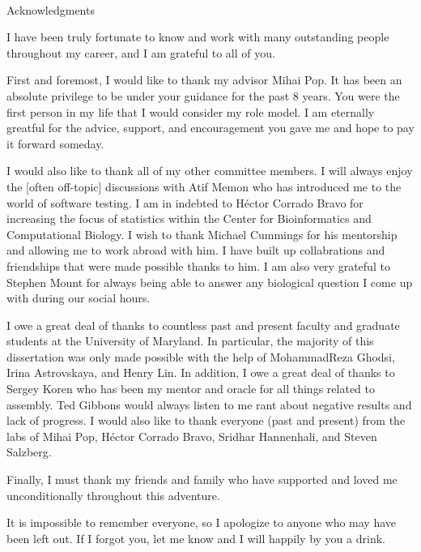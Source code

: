 
\renewcommand{\baselinestretch}{2}
\small\normalsize
\hbox{\ }

\vspace{-.65in}

\begin{center}
\large{Acknowledgments}
\end{center}

\vspace{1ex}

I have been truly fortunate to know and work with many outstanding people throughout my career, and I am grateful to all of you.

First and foremost, I would like to thank my advisor Mihai Pop.
It has been an absolute privilege to be under your guidance for the past 8 years.
You were the first person in my life that I would consider my role model.
I am eternally greatful for the advice, support, and encouragement you gave me and hope to pay it forward someday.

I would also like to thank all of my other committee members. I will always enjoy the [often off-topic] discussions with Atif Memon who has introduced me to the world of software testing.
I am in indebted to H\'{e}ctor Corrado Bravo for increasing the focus of statistics within the Center for Bioinformatics and Computational Biology.
I wish to thank Michael Cummings for his mentorship and allowing me to work abroad with him.
I have built up collabrations and friendships that were made possible thanks to him.
I am also very grateful to Stephen Mount for always being able to answer any biological question I come up with during our social hours.

I owe a great deal of thanks to countless past and present faculty and graduate students at the University of Maryland.
In particular, the majority of this dissertation was only made possible with the help of MohammadReza Ghodsi, Irina Astrovskaya, and Henry Lin.
In addition, I owe a great deal of thanks to Sergey Koren who has been my mentor and oracle for all things related to assembly.
Ted Gibbons would always listen to me rant about negative results and lack of progress.
I would also like to thank everyone (past and present) from the labs of Mihai Pop, H\'{e}ctor Corrado Bravo, Sridhar Hannenhali, and Steven Salzberg.

Finally, I must thank my friends and family who have supported and loved me unconditionally throughout this adventure.

It is impossible to remember everyone, so I apologize to anyone who may have been left out. If I forgot you, let me know and I will happily by you a drink.
